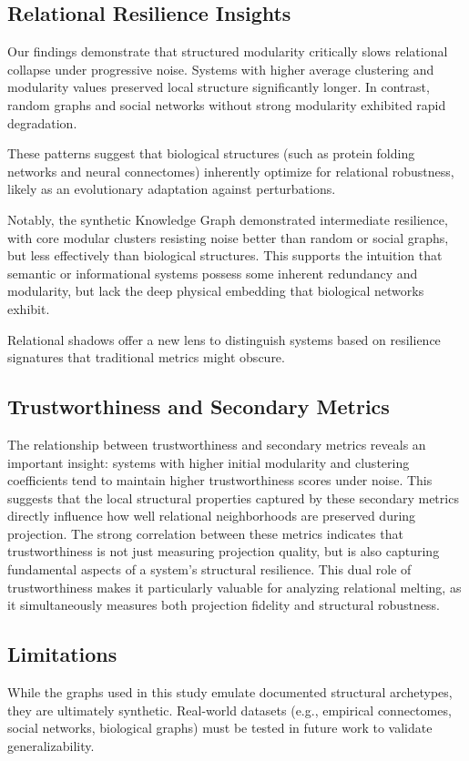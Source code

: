 \documentclass[conference]{IEEEtran}
\begin{document}
\subsection{Relational Resilience Insights}
Our findings demonstrate that structured modularity critically slows relational collapse under progressive noise.  
Systems with higher average clustering and modularity values preserved local structure significantly longer.  
In contrast, random graphs and social networks without strong modularity exhibited rapid degradation.

These patterns suggest that biological structures (such as protein folding networks and neural connectomes) inherently optimize for relational robustness, likely as an evolutionary adaptation against perturbations.

Notably, the synthetic Knowledge Graph demonstrated intermediate resilience, with core modular clusters resisting noise better than random or social graphs, but less effectively than biological structures. This supports the intuition that semantic or informational systems possess some inherent redundancy and modularity, but lack the deep physical embedding that biological networks exhibit.

Relational shadows offer a new lens to distinguish systems based on resilience signatures that traditional metrics might obscure.

\subsection{Trustworthiness and Secondary Metrics}
The relationship between trustworthiness and secondary metrics reveals an important insight: systems with higher initial modularity and clustering coefficients tend to maintain higher trustworthiness scores under noise. This suggests that the local structural properties captured by these secondary metrics directly influence how well relational neighborhoods are preserved during projection. The strong correlation between these metrics indicates that trustworthiness is not just measuring projection quality, but is also capturing fundamental aspects of a system's structural resilience. This dual role of trustworthiness makes it particularly valuable for analyzing relational melting, as it simultaneously measures both projection fidelity and structural robustness.

\subsection{Limitations}
While the graphs used in this study emulate documented structural archetypes, they are ultimately synthetic.  
Real-world datasets (e.g., empirical connectomes, social networks, biological graphs) must be tested in future work to validate generalizability.
\end{document}
